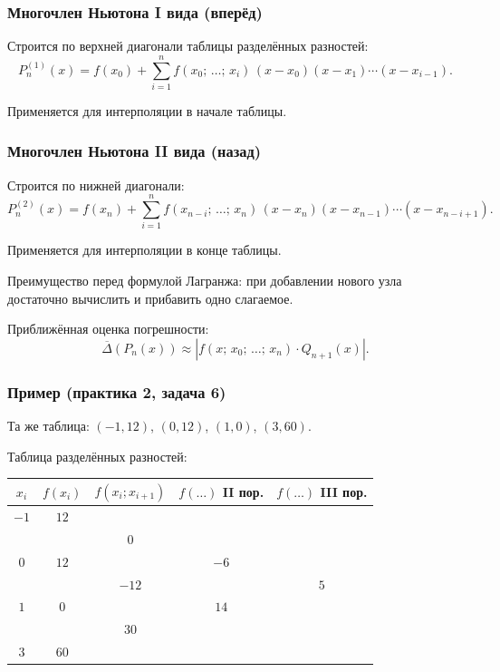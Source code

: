 \subsubsection*{Многочлен Ньютона I вида (вперёд)}

Строится по верхней диагонали таблицы разделённых разностей:
\[
    P_n^{(1)}(x) = f(x_0) + \sum_{i=1}^{n} f(x_0;\, \ldots;\, x_i)\,(x - x_0)(x - x_1) \cdots (x - x_{i-1}).
\]

Применяется для интерполяции в начале таблицы.

\subsubsection*{Многочлен Ньютона II вида (назад)}

Строится по нижней диагонали:
\[
    P_n^{(2)}(x) = f(x_n) + \sum_{i=1}^{n} f(x_{n-i};\, \ldots;\, x_n)\,(x - x_n)(x - x_{n-1}) \cdots (x - x_{n-i+1}).
\]

Применяется для интерполяции в конце таблицы.

Преимущество перед формулой Лагранжа: при добавлении нового узла достаточно вычислить и прибавить одно слагаемое.

Приближённая оценка погрешности:
\[
    \overline{\Delta}(P_n(x)) \approx |f(x;\, x_0;\, \ldots;\, x_n) \cdot Q_{n+1}(x)|.
\]

\subsubsection*{Пример (практика 2, задача 6)}

Та же таблица: $(-1, 12)$, $(0, 12)$, $(1, 0)$, $(3, 60)$.

Таблица разделённых разностей:

\begin{center}
\begin{tabular}{c|c|c|c|c}
    $x_i$ & $f(x_i)$ & $f(x_i; x_{i+1})$ & $f(\ldots)$ II пор. & $f(\ldots)$ III пор. \\
    \hline
    $-1$ & $12$ & & & \\
         &     & $0$ & & \\
    $0$  & $12$ &    & $-6$ & \\
         &     & $-12$ &   & $5$ \\
    $1$  & $0$  &    & $14$ & \\
         &     & $30$ & & \\
    $3$  & $60$ & & &
\end{tabular}
\end{center}

